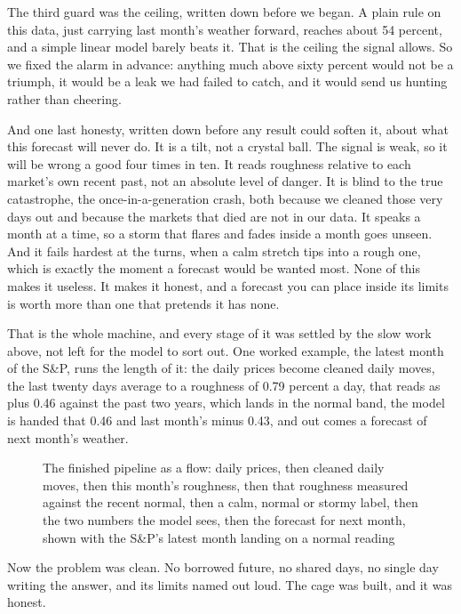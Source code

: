 \documentclass[11pt]{article} %
\begin{document}
The third guard was the ceiling, written down before we began. A plain rule on this data, just carrying last month's weather forward, reaches about 54 percent, and a simple linear model barely beats it. That is the ceiling the signal allows. So we fixed the alarm in advance: anything much above sixty percent would not be a triumph, it would be a leak we had failed to catch, and it would send us hunting rather than cheering.

And one last honesty, written down before any result could soften it, about what this forecast will never do. It is a tilt, not a crystal ball. The signal is weak, so it will be wrong a good four times in ten. It reads roughness relative to each market's own recent past, not an absolute level of danger. It is blind to the true catastrophe, the once-in-a-generation crash, both because we cleaned those very days out and because the markets that died are not in our data. It speaks a month at a time, so a storm that flares and fades inside a month goes unseen. And it fails hardest at the turns, when a calm stretch tips into a rough one, which is exactly the moment a forecast would be wanted most. None of this makes it useless. It makes it honest, and a forecast you can place inside its limits is worth more than one that pretends it has none.

That is the whole machine, and every stage of it was settled by the slow work above, not left for the model to sort out. One worked example, the latest month of the S\&P, runs the length of it: the daily prices become cleaned daily moves, the last twenty days average to a roughness of 0.79 percent a day, that reads as plus 0.46 against the past two years, which lands in the normal band, the model is handed that 0.46 and last month's minus 0.43, and out comes a forecast of next month's weather.

\begin{figure}[htbp]
\centering

\caption{The finished pipeline as a flow: daily prices, then cleaned daily moves, then this month's roughness, then that roughness measured against the recent normal, then a calm, normal or stormy label, then the two numbers the model sees, then the forecast for next month, shown with the S\&P's latest month landing on a normal reading}
\end{figure}


Now the problem was clean. No borrowed future, no shared days, no single day writing the answer, and its limits named out loud. The cage was built, and it was honest.
\end{document}

